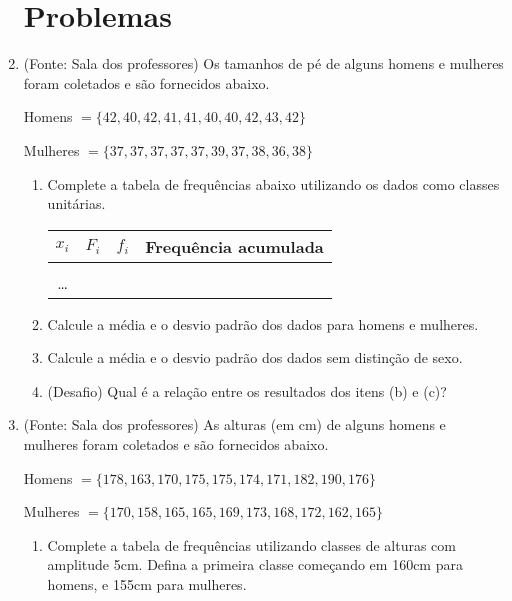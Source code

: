 \documentclass[a4paper]{article}
\begin{document}
\begin{enumerate}
\section{Problemas}


\item (Fonte: Sala dos professores) Os tamanhos de pé de alguns homens
  e mulheres foram coletados e são fornecidos abaixo.

  Homens $=\{42,40,42,41,41,40,40,42,43,42\}$

  Mulheres $=\{37,37,37,37,37,39,37,38,36,38\}$

  \begin{enumerate}
  \item Complete a tabela de frequências abaixo utilizando os dados
    como classes unitárias.

  \begin{center}
  \begin{tabular}[h]{|c|c|c|c|}
    \hline
    $x_i$ & $F_i$ & $f_i$ & Frequência acumulada\\
    \hline
    &&&\\
    \hline
    \ldots&&&\\
    \hline
  \end{tabular}
\end{center}

\item Calcule a média e o desvio padrão dos dados para homens e mulheres.

\item Calcule a média e o desvio padrão dos dados sem distinção de sexo.

\item (Desafio) Qual é a relação entre os resultados dos itens (b) e (c)?

\end{enumerate}


\item (Fonte: Sala dos professores) As alturas (em cm) de alguns
  homens e mulheres foram coletados e são fornecidos abaixo. 

  Homens $=\{178,163,170,175,175,174,171,182,190,176\}$

  Mulheres $=\{170,158,165,165,169,173,168,172,162,165\}$


  \begin{enumerate}
  \item Complete a tabela de frequências utilizando classes de alturas
    com amplitude 5cm. Defina a primeira classe começando em 160cm
    para homens, e 155cm para mulheres.


\end{enumerate}
\end{enumerate}
\end{document}
